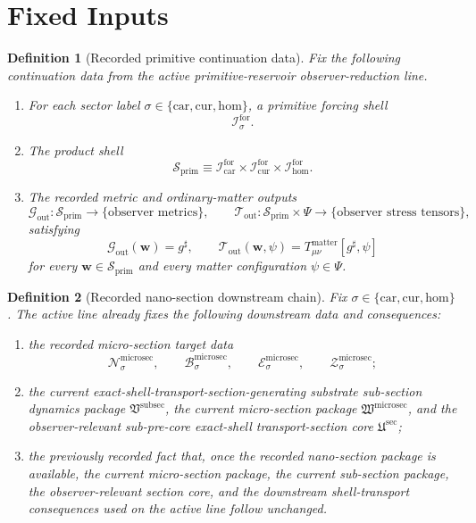 \documentclass[11pt]{article}
\newcommand{\CompletedMetric}{g^{\sharp}}
\newcommand{\MatterSpace}{\Psi}
\newcommand{\Car}{\mathrm{car}}
\newcommand{\Cur}{\mathrm{cur}}
\newcommand{\Hom}{\mathrm{hom}}
\newcommand{\ForSpace}[1]{\mathcal I_{#1}^{\mathrm{for}}}
\newcommand{\PrimShell}{\mathcal S_{\mathrm{prim}}}
\newcommand{\MetricOut}{\mathscr G_{\mathrm{out}}}
\newcommand{\MatterOut}{\mathscr T_{\mathrm{out}}}
\newcommand{\SubSectionPackage}{\mathfrak V^{\mathrm{subsec}}}
\newcommand{\MicroSectionPackage}{\mathfrak W^{\mathrm{microsec}}}
\newcommand{\MicroSectionSpace}[1]{\mathcal N_{#1}^{\mathrm{microsec}}}
\newcommand{\MicroSectionBody}[1]{\mathcal B_{#1}^{\mathrm{microsec}}}
\newcommand{\MicroSectionFunctional}[1]{\mathscr E_{#1}^{\mathrm{microsec}}}
\newcommand{\MicroSectionShell}[1]{\mathcal Z_{#1}^{\mathrm{microsec}}}
\newcommand{\SubPreSectionCore}{\mathfrak U^{\mathrm{sec}}}
\newtheorem{definition}{Definition}
\begin{document}
\section{Fixed Inputs}

\begin{definition}[Recorded primitive continuation data]
\label{def:fixed}
Fix the following continuation data from the active primitive-reservoir observer-reduction line.
\begin{enumerate}
    \item For each sector label \(\sigma\in\{\Car,\Cur,\Hom\}\), a primitive forcing shell
    \[
    \ForSpace{\sigma}.
    \]
    \item The product shell
    \[
    \PrimShell
    \equiv
    \ForSpace{\Car}\times \ForSpace{\Cur}\times \ForSpace{\Hom}.
    \]
    \item The recorded metric and ordinary-matter outputs
    \[
    \MetricOut:\PrimShell\to\{\text{observer metrics}\},
    \qquad
    \MatterOut:\PrimShell\times\MatterSpace\to\{\text{observer stress tensors}\},
    \]
    satisfying
    \begin{equation}
    \MetricOut(\mathbf w)=\CompletedMetric,
    \qquad
    \MatterOut(\mathbf w,\psi)
    =
    T_{\mu\nu}^{\mathrm{matter}}[\CompletedMetric,\psi]
    \label{eq:fixedoutputs}
    \end{equation}
    for every \(\mathbf w\in\PrimShell\) and every matter configuration \(\psi\in\MatterSpace\).
\end{enumerate}
\end{definition}

\begin{definition}[Recorded nano-section downstream chain]
\label{def:downstream}
Fix \(\sigma\in\{\Car,\Cur,\Hom\}\). The active line already fixes the following downstream data and consequences:
\begin{enumerate}
    \item the recorded micro-section target data
    \[
    \MicroSectionSpace{\sigma},\qquad
    \MicroSectionBody{\sigma},\qquad
    \MicroSectionFunctional{\sigma},\qquad
    \MicroSectionShell{\sigma};
    \]
    \item the current exact-shell-transport-section-generating substrate sub-section dynamics package \(\SubSectionPackage\), the current micro-section package \(\MicroSectionPackage\), and the observer-relevant sub-pre-core exact-shell transport-section core \(\SubPreSectionCore\);
    \item the previously recorded fact that, once the recorded nano-section package is available, the current micro-section package, the current sub-section package, the observer-relevant section core, and the downstream shell-transport consequences used on the active line follow unchanged.
\end{enumerate}
\end{definition}
\end{document}

